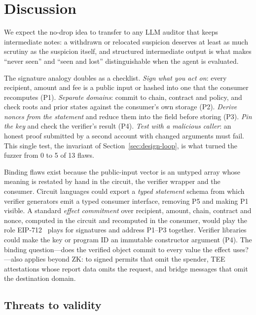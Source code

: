 \section{Discussion}\label{sec:discussion}

We expect the no-drop idea to transfer to any LLM auditor that keeps
intermediate notes: a withdrawn or relocated suspicion deserves at least as
much scrutiny as the suspicion itself, and structured intermediate output is
what makes ``never seen'' and ``seen and lost'' distinguishable when the
agent is evaluated.

The signature analogy doubles as a checklist. \emph{Sign what you act on}:
every recipient, amount and fee is a public input or hashed into one that the
consumer recomputes (P1). \emph{Separate domains}: commit to chain, contract
and policy, and check roots and prior states against the consumer's own
storage (P2). \emph{Derive nonces from the statement} and reduce them into the
field before storing (P3). \emph{Pin the key} and check the verifier's result
(P4). \emph{Test with a malicious caller}: an honest proof submitted by a
second account with changed arguments must fail. This single test, the
invariant of Section~\ref{sec:design-loop}, is what turned the fuzzer from 0
to 5 of 13 flaws.

Binding flaws exist because the public-input vector is an untyped array whose
meaning is restated by hand in the circuit, the verifier wrapper and the
consumer. Circuit languages could export a \emph{typed statement} schema from
which verifier generators emit a typed consumer interface, removing P5 and
making P1 visible. A standard \emph{effect commitment} over recipient,
amount, chain, contract and nonce, computed in the circuit and recomputed in
the consumer, would play the role EIP-712~\cite{eip712} plays for signatures
and address P1--P3 together. Verifier libraries could make the key or program
ID an immutable constructor argument (P4).  The binding question---does the verified object commit to every value
the effect uses?---also applies beyond ZK: to signed permits that omit the
spender, TEE attestations whose report data omits the request, and bridge
messages that omit the destination domain.

\subsection{Threats to validity}\label{sec:threats}

